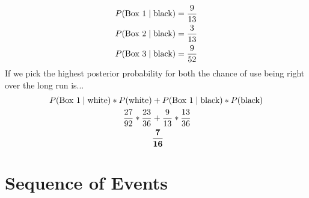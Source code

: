 \documentclass[10pt]{report}
\begin{document}
\begin{enumerate}[(a)]
  \begin{align*}
 P(\textnormal{Box 1} \mid \textnormal{black}) &= \frac{9}{13} \\
P(\textnormal{Box 2} \mid \textnormal{black}) &= \frac{3}{13} \\
P(\textnormal{Box 3} \mid \textnormal{black}) &= \frac{9}{52} \\
 \end{align*}
 If we pick the highest posterior probability for both the chance of use being right over the long run is...\ \\
   \begin{align*}
  P(\textnormal{Box 1} \mid \textnormal{white}) * P(\textnormal{white})&+ P(\textnormal{Box 1} \mid \textnormal{black}) * P(\textnormal{black})  \\
\frac{27}{92} * \frac{23}{36} &+ \frac{9}{13} * \frac{13}{36} \\
&\mathbf{\frac{7}{16}}
 \end{align*}
\end{enumerate}
\section{\sc\color{cit}Sequence of Events}
\setcounter{subsection}{5}
\end{document}
